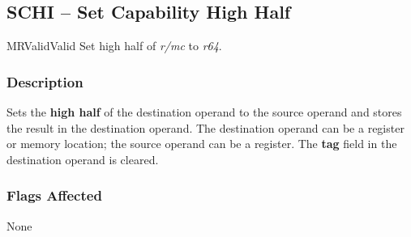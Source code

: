 \clearpage
{}
{}
\subsection*{SCHI -- Set Capability High Half}

\begin{x86opcodetable}
  {MR}{Valid}{Valid}
  {Set high half of \emph{r/mc} to \emph{r64}.}
\end{x86opcodetable}

\begin{x86opentable}
\end{x86opentable}

\subsubsection*{Description}

Sets the \textbf{high half} of the destination operand to the source
operand and stores the result in the destination operand.  The
destination operand can be a register or memory location; the source
operand can be a register.  The \textbf{tag} field in the destination
operand is cleared.

\subsubsection*{Flags Affected}

None

